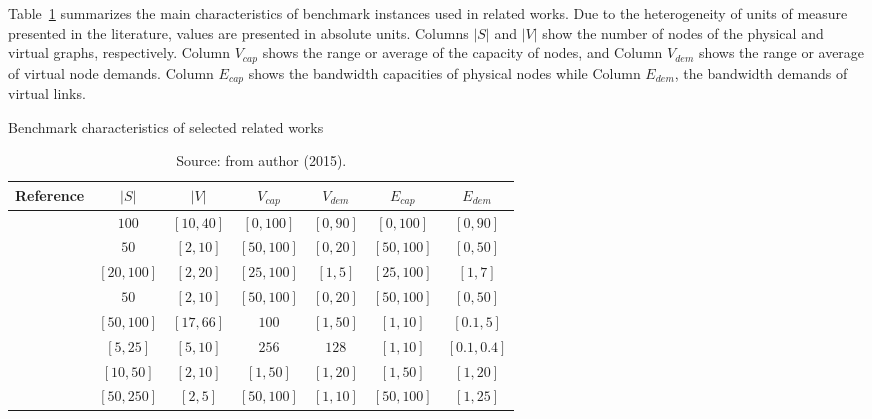 Table~\ref{tab:releval} summarizes the main characteristics of benchmark instances used in related works.
Due to the heterogeneity of units of measure presented in the literature, values are presented in absolute units. 
Columns $|S|$ and $|V|$ show the number of nodes of the physical and virtual graphs, respectively. Column $V_{cap}$ shows the range or average of the capacity of nodes, and Column $V_{dem}$ shows the range or average of virtual node demands. Column $E_{cap}$ shows the bandwidth capacities of physical nodes while Column $E_{dem}$, the bandwidth demands of virtual links.

\begin{table}[h]
\begin{center}
  \footnotesize
  \caption{Benchmark characteristics of selected related works}\label{tab:releval}
  \begin{tabular}{l c c c c c c}
  \hline
  Reference             & $|S|$       & $|V|$     & $V_{cap}$  & $V_{dem}$ & $E_{cap}$   & $E_{dem}$      \\
  \hline
  \citet{Lischka:2009}   & $100$       & $[10,40]$ & $[0,100]$  & $[0,90]$  & $[0,100]$    & $[0,90]$       \\
  \citet{Houidi:2011}    & $50$        & $[2,10]$  & $[50,100]$ & $[0,20]$  & $[50,100]$   & $[0,50]$       \\
  \citet{infuhr:2011}    & $[20,100]$  & $[2,20]$  & $[25,100]$ & $[1,5]$ & $[25,100]$     & $[1,7]$        \\
  \citet{Chowdhury:2012}  & $50$        & $[2,10]$  & $[50,100]$ & $[0,20]$  & $[50,100]$   & $[0,50]$      \\
  \citet{Buriol:2012}    & $[50,100]$  & $[17,66]$ & $100$        & $[1,50]$  & $[1,10]$    & $[0.1,5]$     \\
  \citet{Alkmim:2011}    & $[5,25] $   & $[5,10]$  & $256$        & $128$       & $[1,10]$    & $[0.1,0.4]$ \\
  \citet{hu:2013}        & $[10,50]$   & $[2,10]$  & $[1,50]$   & $[1,20]$  & $[1,50]$     & $[1,20]$       \\
  \citet{Guerzoni:2014}  & $[50,250]$  & $[2,5]$   & $[50,100]$ & $[1,10]$  & $[50,100]$  & $[1,25]$        \\
  \hline
  \end{tabular}\caption*{Source: from author (2015).}
\end{center}
\end{table}



